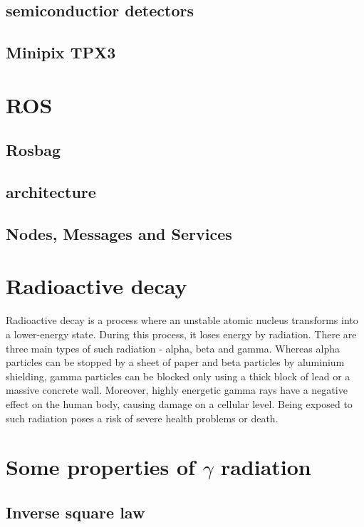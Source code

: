 \subsection{semiconductior detectors}
\subsection{Minipix TPX3}

\section{ROS}
\subsection{Rosbag}
\subsection{architecture}
\subsection{Nodes, Messages and Services}

\section{Radioactive decay}
Radioactive decay is a process where an unstable atomic nucleus transforms into a lower-energy state.
During this process, it loses energy by radiation.
There are three main types of such radiation - alpha, beta and gamma.
Whereas alpha particles can be stopped by a sheet of paper and beta particles by aluminium shielding, gamma particles can be blocked only using a thick block of lead or a massive concrete wall.
Moreover, highly energetic gamma rays have a negative effect on the human body, causing damage on a cellular level.
Being exposed to such radiation poses a risk of severe health problems or death.

\section{Some properties of $\gamma$ radiation}
\subsection{Inverse square law}
